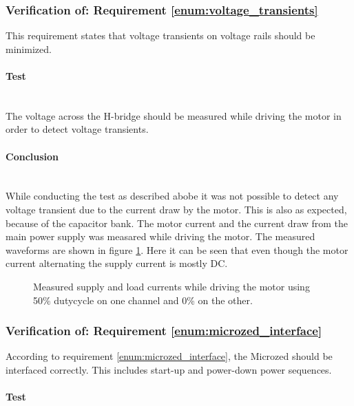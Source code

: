 \subsubsection{Verification of: Requirement \ref{enum:voltage_transients}} %
\label{ssub:requirement_enum:voltage_transients}
This requirement states that voltage transients on voltage rails should be minimized.

\paragraph{Test}~\\
The voltage across the H-bridge should be measured while driving the motor in order to detect voltage transients. 

\paragraph{Conclusion}~\\
While conducting the test as described abobe it was not possible to detect any voltage transient due to the current draw by the motor.
This is also as expected, because of the capacitor bank.
The motor current and the current draw from the main power supply was measared while driving the motor.
The measured waveforms are shown in figure \ref{fig:controllerboardv2_currents}.
Here it can be seen that even though the motor current alternating the supply current is mostly DC.
\begin{figure}[h]
	\centering
	\caption[Measured supply and load currents.]{Measured supply and load currents while driving the motor using 50\% dutycycle on one channel and 0\% on the other.}
	\label{fig:controllerboardv2_currents}
\end{figure}

\subsubsection{Verification of: Requirement \ref{enum:microzed_interface}} %
\label{ssub:requirement_enum:microzed_interface}
According to requirement  \ref{enum:microzed_interface}, the Microzed should be interfaced correctly. 
This includes start-up and power-down power sequences.

\paragraph{Test}~\\

